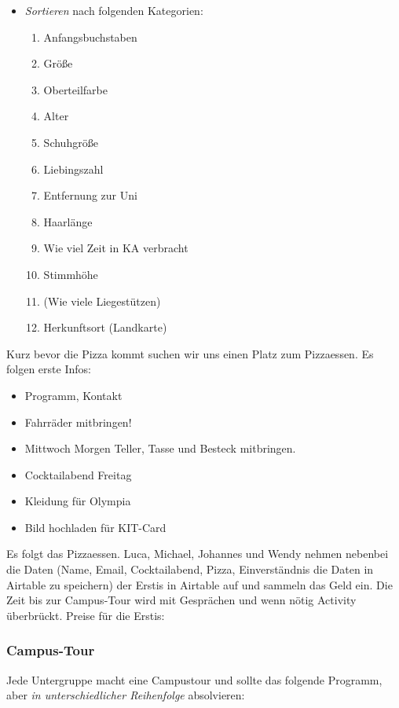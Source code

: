 \documentclass[10pt,ngerman]{scrartcl}
\begin{document}
\begin{multicols}{2}
\begin{itemize}
    \item \emph{Sortieren} nach folgenden Kategorien:
        \begin{enumerate}
            \item Anfangsbuchstaben
            \item Größe
            \item Oberteilfarbe
            \item Alter
            \item Schuhgröße
            \item Liebingszahl
            \item Entfernung zur Uni
            \item Haarlänge
            \item Wie viel Zeit in KA verbracht
            \item Stimmhöhe
            \item (Wie viele Liegestützen)
            \item Herkunftsort (Landkarte)
        \end{enumerate}
\end{itemize}

Kurz bevor die Pizza kommt suchen wir uns einen Platz zum Pizzaessen.
Es folgen erste Infos:
\begin{itemize}
    \item Programm, Kontakt
    \item Fahrräder mitbringen!
    \item Mittwoch Morgen Teller, Tasse und Besteck mitbringen.
    \item Cocktailabend Freitag
    \item Kleidung für Olympia
    \item Bild hochladen für KIT-Card
\end{itemize}
Es folgt das Pizzaessen. Luca, Michael, Johannes und Wendy nehmen
nebenbei die Daten (Name, Email, Cocktailabend, Pizza, Einverständnis
die Daten in Airtable zu speichern) der Erstis in Airtable auf und
sammeln das Geld ein. Die Zeit bis zur Campus-Tour wird mit Gesprächen
und wenn nötig Activity überbrückt. Preise für die Erstis:

\subsubsection{Campus-Tour}

Jede Untergruppe macht eine Campustour und sollte das folgende Programm, aber
\emph{in unterschiedlicher Reihenfolge} absolvieren:


\end{multicols}
\end{document}

